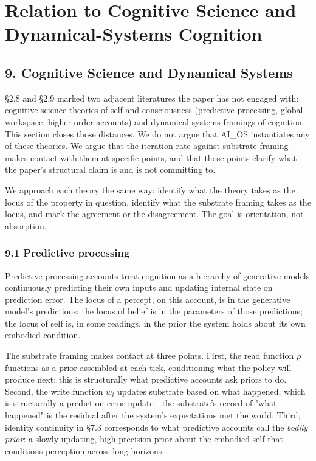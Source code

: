 \documentclass[11pt,letterpaper]{article}
\begin{document}
\section{Relation to Cognitive Science and Dynamical-Systems Cognition}
\subsection*{9. Cognitive Science and Dynamical Systems}

§2.8 and §2.9 marked two adjacent literatures the paper has not engaged with: cognitive-science theories of self and consciousness (predictive processing, global workspace, higher-order accounts) and dynamical-systems framings of cognition. This section closes those distances. We do not argue that AI\_OS instantiates any of these theories. We argue that the iteration-rate-against-substrate framing makes contact with them at specific points, and that those points clarify what the paper's structural claim is and is not committing to.

We approach each theory the same way: identify what the theory takes as the locus of the property in question, identify what the substrate framing takes as the locus, and mark the agreement or the disagreement. The goal is orientation, not absorption.

\subsubsection*{9.1 Predictive processing}

Predictive-processing accounts treat cognition as a hierarchy of generative models continuously predicting their own inputs and updating internal state on prediction error. The locus of a percept, on this account, is in the generative model's predictions; the locus of belief is in the parameters of those predictions; the locus of self is, in some readings, in the prior the system holds about its own embodied condition.

The substrate framing makes contact at three points. First, the read function $\rho$ functions as a prior assembled at each tick, conditioning what the policy will produce next; this is structurally what predictive accounts ask priors to do. Second, the write function $w_i$ updates substrate based on what happened, which is structurally a prediction-error update---the substrate's record of "what happened" is the residual after the system's expectations met the world. Third, identity continuity in §7.3 corresponds to what predictive accounts call the \emph{bodily prior}: a slowly-updating, high-precision prior about the embodied self that conditions perception across long horizons.
\end{document}
